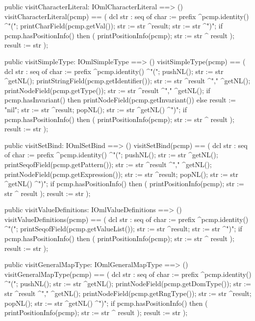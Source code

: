 \begin{vdm_al}
  public visitCharacterLiteral: IOmlCharacterLiteral ==> ()
  visitCharacterLiteral(pcmp) ==
    ( dcl str : seq of char := prefix ^pcmp.identity() ^"(";
      printCharField(pcmp.getVal());
      str := str ^result;
      str := str ^")";
      if pcmp.hasPositionInfo()
      then ( printPositionInfo(pcmp);
             str := str ^ result );
      result := str );

  public visitSimpleType: IOmlSimpleType ==> ()
  visitSimpleType(pcmp) ==
    ( dcl str : seq of char := prefix ^pcmp.identity() ^"(";
      pushNL();
      str := str ^getNL();
      printStringField(pcmp.getIdentifier());
      str := str ^result ^"," ^getNL();
      printNodeField(pcmp.getType());
      str := str ^result ^"," ^getNL();
      if pcmp.hasInvariant()
      then printNodeField(pcmp.getInvariant())
      else result := "nil";
      str := str ^result;
      popNL();
      str := str ^getNL() ^")";
      if pcmp.hasPositionInfo()
      then ( printPositionInfo(pcmp);
             str := str ^ result );
      result := str );

  public visitSetBind: IOmlSetBind ==> ()
  visitSetBind(pcmp) ==
    ( dcl str : seq of char := prefix ^pcmp.identity() ^"(";
      pushNL();
      str := str ^getNL();
      printSeqofField(pcmp.getPattern());
      str := str ^result ^"," ^getNL();
      printNodeField(pcmp.getExpression());
      str := str ^result;
      popNL();
      str := str ^getNL() ^")";
      if pcmp.hasPositionInfo()
      then ( printPositionInfo(pcmp);
             str := str ^ result );
      result := str );

  public visitValueDefinitions: IOmlValueDefinitions ==> ()
  visitValueDefinitions(pcmp) ==
    ( dcl str : seq of char := prefix ^pcmp.identity() ^"(";
      printSeqofField(pcmp.getValueList());
      str := str ^result;
      str := str ^")";
      if pcmp.hasPositionInfo()
      then ( printPositionInfo(pcmp);
             str := str ^ result );
      result := str );

  public visitGeneralMapType: IOmlGeneralMapType ==> ()
  visitGeneralMapType(pcmp) ==
    ( dcl str : seq of char := prefix ^pcmp.identity() ^"(";
      pushNL();
      str := str ^getNL();
      printNodeField(pcmp.getDomType());
      str := str ^result ^"," ^getNL();
      printNodeField(pcmp.getRngType());
      str := str ^result;
      popNL();
      str := str ^getNL() ^")";
      if pcmp.hasPositionInfo()
      then ( printPositionInfo(pcmp);
             str := str ^ result );
      result := str );


\end{vdm_al}
